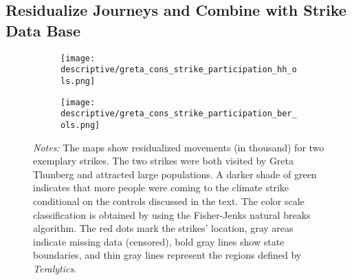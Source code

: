 \subsection{Residualize Journeys and Combine with Strike Data Base}

\begin{figure}[t]\centering
	\caption{Strike participation for selected strikes}
	\label{fig_greta_cons:strike_participation_hh_ber}
	\begin{subfigure}[h]{0.45\linewidth}\centering
		\texttt{[image: descriptive/greta\_cons\_strike\_participation\_hh\_ols.png]}
	\end{subfigure}
	\begin{subfigure}[h]{0.45\linewidth}\centering
		\texttt{[image: descriptive/greta\_cons\_strike\_participation\_ber\_ols.png]}
	\end{subfigure}
	\begin{minipage}{0.9\linewidth}
		\scriptsize{\emph{Notes:} The maps show residualized movements (in thousand) for two exemplary strikes. The two strikes were both visited by Greta Thunberg and attracted large populations. A darker shade of green indicates that more people were coming to the climate strike conditional on the controls discussed in the text. The color scale classification is obtained by using the Fisher-Jenks natural breaks algorithm. The red dots mark the strikes' location, gray areas indicate missing data (censored), bold gray lines show state boundaries, and thin gray lines represent the regions defined by \textit{Teralytics}.}
	\end{minipage}
\end{figure}

